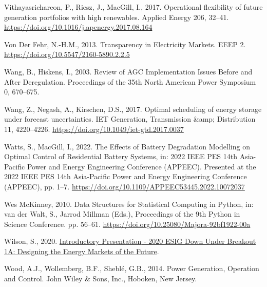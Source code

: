 \documentclass[12pt,a4paper,]{report}
\newlength{\cslhangindent}
\newenvironment{CSLReferences}[2] %
 {%
  \setlength{\parindent}{0pt}
  \ifodd #1 \everypar{\setlength{\hangindent}{\cslhangindent}}\ignorespaces\fi
  \ifnum #2 > 0
  \setlength{\parskip}{#2\baselineskip}
  \fi
 }%
 {}
\begin{document}
\begin{CSLReferences}{1}{0}
\leavevmode{}%
Vithayasrichareon, P., Riesz, J., MacGill, I., 2017. Operational
flexibility of future generation portfolios with high renewables.
Applied Energy 206, 32--41.
\url{https://doi.org/10.1016/j.apenergy.2017.08.164}

\leavevmode{}%
Von Der Fehr, N.-H.M., 2013. Transparency in {Electricity Markets}. EEEP
2. \url{https://doi.org/10.5547/2160-5890.2.2.5}

\leavevmode{}%
Wang, B., Hiskens, I., 2003. Review of {AGC Implementation Issues
Before} and {After Deregulation}. Proceedings of the 35th North American
Power Symposium 0, 670--675.

\leavevmode{}%
Wang, Z., Negash, A., Kirschen, D.S., 2017. Optimal scheduling of energy
storage under forecast uncertainties. IET Generation, Transmission
\&amp; Distribution 11, 4220--4226.
\url{https://doi.org/10.1049/iet-gtd.2017.0037}

\leavevmode{}%
Watts, S., MacGill, I., 2022. The {Effects} of {Battery Degradation
Modelling} on {Optimal Control} of {Residential Battery Systems}, in:
2022 {IEEE PES} 14th {Asia-Pacific Power} and {Energy Engineering
Conference} ({APPEEC}). Presented at the 2022 {IEEE PES} 14th
{Asia-Pacific Power} and {Energy Engineering Conference} ({APPEEC}), pp.
1--7. \url{https://doi.org/10.1109/APPEEC53445.2022.10072037}

\leavevmode{}%
Wes McKinney, 2010. Data {Structures} for {Statistical Computing} in
{Python}, in: van der Walt, S., Jarrod Millman (Eds.), Proceedings of
the 9th {Python} in {Science Conference}. pp. 56--61.
\url{https://doi.org/10.25080/Majora-92bf1922-00a}

\leavevmode{}%
Wilson, S., 2020.
\href{https://www.youtube.com/watch?v=LpYnKVC9hGY&feature=youtu.be}{Introductory
{Presentation} - 2020 {ESIG Down Under Breakout 1A}: {Designing} the
{Energy Markets} of the {Future}}.

\leavevmode{}%
Wood, A.J., Wollemberg, B.F., Sheblé, G.B., 2014. Power {Generation},
{Operation} and {Control}. {John Wiley \& Sons, Inc.}, {Hoboken, New
Jersey}.


\end{CSLReferences}
\end{document}
